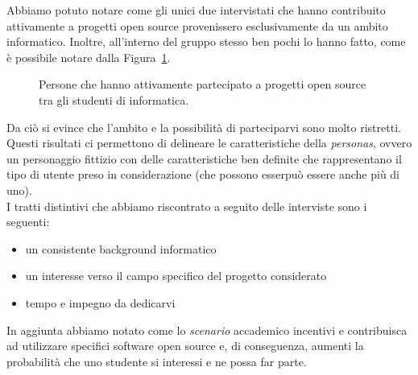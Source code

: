 \documentclass[12pt]{article} %
\begin{document}
Abbiamo potuto notare come gli unici due intervistati che hanno contribuito attivamente a progetti open source provenissero esclusivamente da un ambito informatico. Inoltre, all'interno del gruppo stesso ben pochi lo hanno fatto, come \`e possibile notare dalla Figura~\ref{fig:distribuzioneInformatica}.

\begin{figure}[H]
\caption{Persone che hanno attivamente partecipato a progetti open source tra gli studenti di informatica.}
\label{fig:distribuzioneInformatica}
\end{figure}

Da ci\`o si evince che l'ambito e la possibilit\`a di parteciparvi sono molto ristretti. Questi risultati ci permettono di delineare le caratteristiche della \emph{personas}, ovvero un personaggio fittizio con delle caratteristiche ben definite che rappresentano il tipo di utente preso in considerazione (che possono esserpu\`o essere anche pi\`u di uno).\\
I tratti distintivi che abbiamo riscontrato a seguito delle interviste sono i seguenti:
\begin{itemize}
\item un consistente background informatico
\item un interesse verso il campo specifico del progetto considerato
\item tempo e impegno da dedicarvi
\end{itemize}

In aggiunta abbiamo notato come lo \emph{scenario} accademico incentivi e contribuisca ad utilizzare specifici software open source e, di conseguenza, aumenti la probabilit\`a che uno studente si interessi e ne possa far parte.
\end{document}
